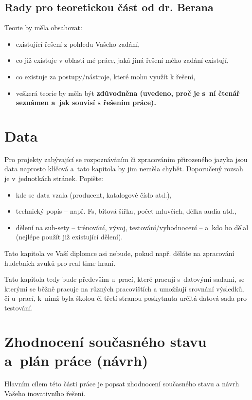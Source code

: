 \subsection*{Rady pro teoretickou část od dr. Berana}
Teorie by měla obsahovat:
\begin{itemize}
  \item{existující řešení z pohledu Vašeho zadání,}
  \item{co již existuje v oblasti mé práce, jaká jiná řešení mého zadání existují,}
  \item{co existuje za postupy/nástroje, které mohu využít k řešení,}
  \item{veškerá teorie by měla být \bf zdůvodněna \rm (uvedeno, proč je s~ní čtenář seznámen a~jak souvisí s řešením práce).}
\end{itemize}

\section{Data}

Pro projekty zabývající se rozpoznáváním či zpracováním přirozeného jazyka jsou data naprosto klíčová a~tato kapitola by jim neměla chybět. Doporučený rozsah je v~jednotkách stránek. Popište:
\begin{itemize}
  \item{kde se data vzala (producent, katalogové číslo atd.),}
  \item{technický popis -- např. Fs, bitová šířka, počet mluvčích, délka audia atd.,}
  \item{dělení na sub-sety -- trénování, vývoj, testování/vyhodnocení -- a~kdo ho dělal (nejlépe použít již existující dělení).}
\end{itemize}

Tato kapitola ve Vaší diplomce asi nebude, pokud např. děláte na zpracování hudebních zvuků pro real-time hraní.

Tato kapitola tedy bude především u~prací, které pracují s~datovými sadami, se kterými se běžně pracuje na různých pracovištích a umožňují srovnání výsledků, či u~prací, k~nimž byla školou či třetí stranou poskytnuta určitá datová sada pro testování.


\section{Zhodnocení současného stavu a~plán práce (návrh)}
\label{navrh}

Hlavním cílem této části práce je popsat zhodnocení současného stavu a návrh Vašeho inovativního řešení.

